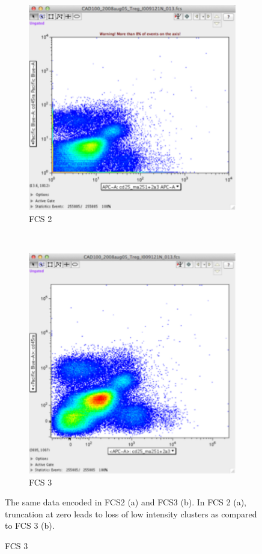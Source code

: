 \begin{figure}[h]
\centering
\begin{subfigure}[b]{.4\textwidth}
    \centering
    \includegraphics[scale=.3]{figures/fcs2.pdf}
    \caption{ FCS 2 }
\end{subfigure}
~
\begin{subfigure}[b]{.4\textwidth}
    \centering
    \includegraphics[scale=.3]{figures/fcs3.pdf}
    \caption{ FCS 3 }
\end{subfigure} 
  {The same data encoded in FCS2 (a) and FCS3 (b).}
  {
    In FCS 2 (a), truncation at zero leads to loss of low intensity clusters as compared to FCS 3 (b).
  }
\end{figure}


